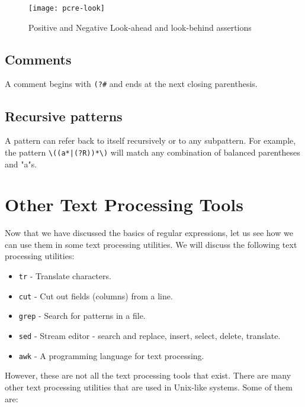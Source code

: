 \begin{figure}[h!]
  \texttt{[image: pcre-look]}
  \caption{Positive and Negative Look-ahead and look-behind assertions}
\end{figure}

\subsection{Comments}

A comment begins with \lstinline|(?#| and ends at the next closing parenthesis.

\subsection{Recursive patterns}

A pattern can refer back to itself recursively or to any subpattern. For example, the pattern \lstinline:\((a*|(?R))*\): will match any combination of balanced parentheses and "a"s.

\newpage
\section{Other Text Processing Tools}

Now that we have discussed the basics of regular expressions, let us see how we can use them in some text processing utilities. We will discuss the following text processing utilities:

\begin{itemize}
  \item \lstinline|tr| - Translate characters.
  \item \lstinline|cut| - Cut out fields (columns) from a line.
  \item \lstinline|grep| - Search for patterns in a file.
  \item \lstinline|sed| - Stream editor - search and replace, insert, select, delete, translate.
  \item \lstinline|awk| - A programming language for text processing.
\end{itemize}

However, these are not all the text processing tools that exist. There are many other text processing utilities that are used in Unix-like systems. Some of them are:

